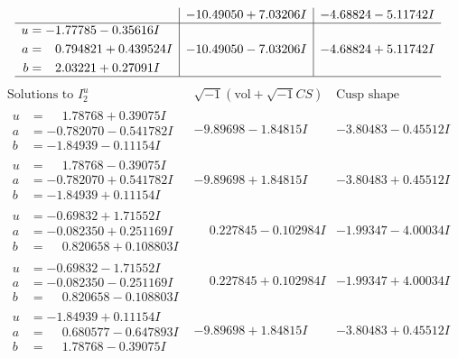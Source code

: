 \documentclass[1p]{elsarticle_modified}
\theoremstyle{definition}
\newcommand{\I}{\sqrt{-1}}
\begin{document}
$$\begin{array}{c|c|c}
 & -10.49050 + 7.03206 I & -4.68824 - 5.11742 I \\ \hline\begin{aligned}
u &= -1.77785 - 0.35616 I \\
a &= \phantom{-}0.794821 + 0.439524 I \\
b &= \phantom{-}2.03221 + 0.27091 I\end{aligned}
 & -10.49050 - 7.03206 I & -4.68824 + 5.11742 I\\
 \hline 
 \end{array}$$\newpage$$\begin{array}{c|c|c}  
\text{Solutions to }I^u_{2}& \I (\text{vol} + \sqrt{-1}CS) & \text{Cusp shape}\\
 \hline 
\begin{aligned}
u &= \phantom{-}1.78768 + 0.39075 I \\
a &= -0.782070 - 0.541782 I \\
b &= -1.84939 - 0.11154 I\end{aligned}
 & -9.89698 - 1.84815 I & -3.80483 - 0.45512 I \\ \hline\begin{aligned}
u &= \phantom{-}1.78768 - 0.39075 I \\
a &= -0.782070 + 0.541782 I \\
b &= -1.84939 + 0.11154 I\end{aligned}
 & -9.89698 + 1.84815 I & -3.80483 + 0.45512 I \\ \hline\begin{aligned}
u &= -0.69832 + 1.71552 I \\
a &= -0.082350 + 0.251169 I \\
b &= \phantom{-}0.820658 + 0.108803 I\end{aligned}
 & \phantom{-}0.227845 - 0.102984 I & -1.99347 - 4.00034 I \\ \hline\begin{aligned}
u &= -0.69832 - 1.71552 I \\
a &= -0.082350 - 0.251169 I \\
b &= \phantom{-}0.820658 - 0.108803 I\end{aligned}
 & \phantom{-}0.227845 + 0.102984 I & -1.99347 + 4.00034 I \\ \hline\begin{aligned}
u &= -1.84939 + 0.11154 I \\
a &= \phantom{-}0.680577 - 0.647893 I \\
b &= \phantom{-}1.78768 - 0.39075 I\end{aligned}
 & -9.89698 + 1.84815 I & -3.80483 + 0.45512 I \\ \hline\begin{aligned}

\end{aligned}
\end{array}$$
\end{document}
